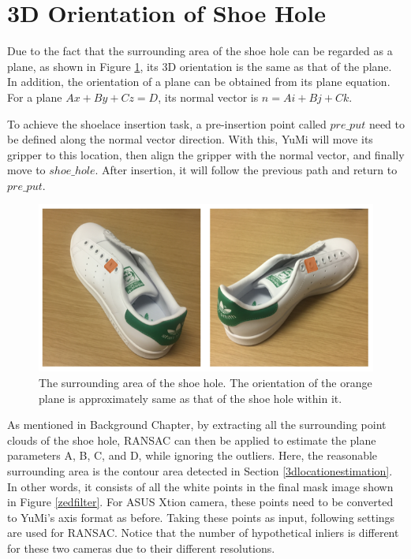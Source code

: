 \section{3D Orientation of Shoe Hole} \label{3DOrientationofShoeHole}
Due to the fact that the surrounding area of the shoe hole can be regarded as a plane, as shown in Figure \ref{plane}, its 3D orientation is the same as that of the plane. In addition, the orientation of a plane can be obtained from its plane equation. For a plane $Ax + By + Cz = D$, its normal vector is $n = Ai + Bj + Ck$.

To achieve the shoelace insertion task, a pre-insertion point called $pre\_put$ need to be defined along the normal vector direction. With this, YuMi will move its gripper to this location, then align the gripper with the normal vector, and finally move to $shoe\_hole$. After insertion, it will follow the previous path and return to $pre\_put$.

\begin{figure}[H]
\centering
\includegraphics[width = 0.7\columnwidth]{Implementation/cv/plane.png}
\caption{The surrounding area of the shoe hole. The orientation of the orange plane is approximately same as that of the shoe hole within it.}
\label{plane}
\end{figure}

As mentioned in Background Chapter, by extracting all the surrounding point clouds of the shoe hole, RANSAC can then be applied to estimate the plane parameters A, B, C, and D, while ignoring the outliers. Here, the reasonable surrounding area is the contour area detected in Section \ref{3dlocationestimation}. In other words, it consists of all the white points in the final mask image shown in Figure \ref{zedfilter}. For ASUS Xtion camera, these points need to be converted to YuMi's axis format as before. Taking these points as input, following settings are used for RANSAC. Notice that the number of hypothetical inliers is different for these two cameras due to their different resolutions.

\begin{table}[H]
\centering
{}
\caption{RANSAC parameters setting}
\label{ransacsetting}
\end{table}

